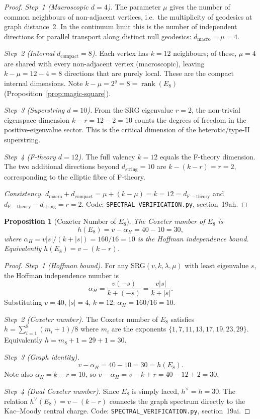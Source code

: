 \documentclass[12pt,a4paper]{article}
\newtheorem{proposition}[theorem]{Proposition}
\begin{document}
\begin{proof}
\emph{Step~1 (Macroscopic $d=4$).}
The parameter $\mu$ gives the number of common neighbours of
non-adjacent vertices, i.e.\ the multiplicity of geodesics
at graph distance~2.  In the continuum limit this is the
number of independent directions for parallel transport
along distinct null geodesics: $d_{\mathrm{macro}} = \mu = 4$.

\emph{Step~2 (Internal $d_{\mathrm{compact}} = 8$).}
Each vertex has $k = 12$ neighbours; of these,
$\mu = 4$ are shared with every non-adjacent vertex
(macroscopic), leaving $k - \mu = 12 - 4 = 8$ directions that
are purely local.  These are the compact internal dimensions.
Note $k - \mu = 2^q = 8 = \operatorname{rank}(E_8)$
(Proposition~\ref{prop:magic-square}).

\emph{Step~3 (Superstring $d=10$).}
From the SRG eigenvalue $r = 2$, the non-trivial
eigenspace dimension $k - r = 12 - 2 = 10$ counts the
degrees of freedom in the positive-eigenvalue sector.
This is the critical dimension of the heterotic/type-II
superstring.

\emph{Step~4 (F-theory $d=12$).}
The full valency $k = 12$ equals the F-theory dimension.
The two additional directions beyond $d_{\mathrm{string}} = 10$
are $k - (k{-}r) = r = 2$, corresponding to the elliptic
fibre of F-theory.

\emph{Consistency.}
$d_{\mathrm{macro}} + d_{\mathrm{compact}} = \mu + (k - \mu) = k = 12
= d_{\mathrm{F-theory}}$
and $d_{\mathrm{F-theory}} - d_{\mathrm{string}} = r = 2$.
Code: \texttt{SPECTRAL\_VERIFICATION.py}, section~19ah.
\end{proof}


\begin{proposition}[Coxeter Number of $E_8$]\label{prop:coxeter-e8}
The Coxeter number of $E_8$ is
\[
  h(E_8) = v - \alpha_H = 40 - 10 = 30,
\]
where $\alpha_H = v|s|/(k + |s|) = 160/16 = 10$ is the Hoffman
independence bound.  Equivalently $h(E_8) = v - (k - r)$.
\end{proposition}

\begin{proof}
\emph{Step~1 (Hoffman bound).}
For any SRG$(v,k,\lambda,\mu)$ with least eigenvalue $s$,
the Hoffman independence number is
\[
  \alpha_H = \frac{v(-s)}{k + (-s)} = \frac{v|s|}{k + |s|}.
\]
Substituting $v=40$, $|s|=4$, $k=12$:
$\alpha_H = 160/16 = 10$.

\emph{Step~2 (Coxeter number).}
The Coxeter number of $E_8$ satisfies $h = \sum_{i=1}^{8}(m_i + 1)/8$
where $m_i$ are the exponents $\{1,7,11,13,17,19,23,29\}$.
Equivalently $h = m_8 + 1 = 29 + 1 = 30$.

\emph{Step~3 (Graph identity).}
\[
  v - \alpha_H = 40 - 10 = 30 = h(E_8).
\]
Note also $\alpha_H = k - r = 10$, so $v - \alpha_H = v - k + r
= 40 - 12 + 2 = 30$.

\emph{Step~4 (Dual Coxeter number).}
Since $E_8$ is simply laced, $h^\vee = h = 30$.
The relation $h^\vee(E_8) = v - (k-r)$ connects
the graph spectrum directly to the Kac--Moody central charge.
Code: \texttt{SPECTRAL\_VERIFICATION.py}, section~19ai.
\end{proof}
\end{document}
